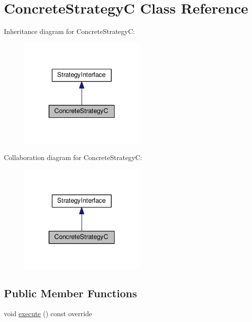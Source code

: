 \hypertarget{classConcreteStrategyC}{}\section{Concrete\+StrategyC Class Reference}
\label{classConcreteStrategyC}


Inheritance diagram for Concrete\+StrategyC\+:
\nopagebreak
\begin{figure}[H]
\begin{center}
\leavevmode
\includegraphics[width=181pt]{classConcreteStrategyC__inherit__graph}
\end{center}
\end{figure}


Collaboration diagram for Concrete\+StrategyC\+:
\nopagebreak
\begin{figure}[H]
\begin{center}
\leavevmode
\includegraphics[width=181pt]{classConcreteStrategyC__coll__graph}
\end{center}
\end{figure}
\subsection*{Public Member Functions}
\begin{DoxyCompactItemize}
\item 
void \hyperlink{classConcreteStrategyC_a02c38120b6af81bfaa69d6a5f11c6fde}{execute} () const override
\end{DoxyCompactItemize}


